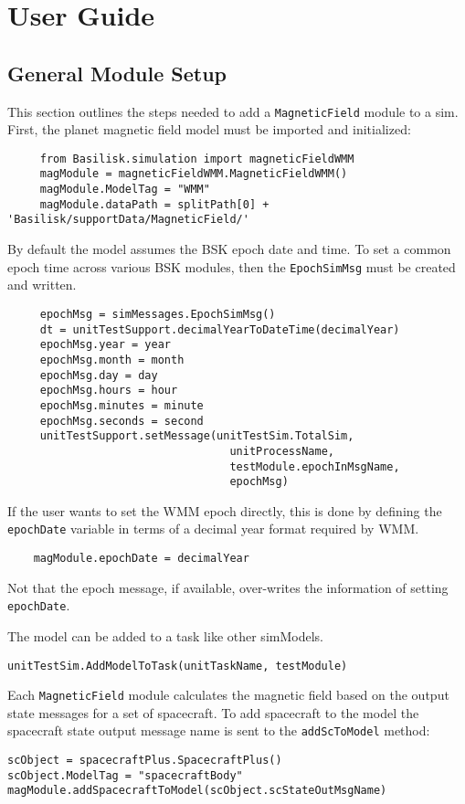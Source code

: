 
\section{User Guide}

\subsection{General Module Setup}
This section outlines the steps needed to add a {\tt MagneticField} module to a sim.
First, the planet magnetic field model must be imported and initialized:
\begin{verbatim}
     from Basilisk.simulation import magneticFieldWMM
     magModule = magneticFieldWMM.MagneticFieldWMM()
     magModule.ModelTag = "WMM"
     magModule.dataPath = splitPath[0] + 'Basilisk/supportData/MagneticField/'
\end{verbatim}
By default the model assumes the BSK epoch date and time.  To set a common epoch time across various BSK modules, then the {\tt EpochSimMsg} must be created and written.
\begin{verbatim}
     epochMsg = simMessages.EpochSimMsg()
     dt = unitTestSupport.decimalYearToDateTime(decimalYear)
     epochMsg.year = year
     epochMsg.month = month
     epochMsg.day = day
     epochMsg.hours = hour
     epochMsg.minutes = minute
     epochMsg.seconds = second
     unitTestSupport.setMessage(unitTestSim.TotalSim,
                                  unitProcessName,
                                  testModule.epochInMsgName,
                                  epochMsg)
\end{verbatim}
If the user wants to set the WMM epoch directly, this is done by defining the {\tt epochDate} variable in terms of a decimal year format required by WMM. 
\begin{verbatim}
	magModule.epochDate = decimalYear
\end{verbatim}
Not that the epoch message, if available, over-writes the information of setting {\tt epochDate}.  

The model can  be added to a task like other simModels. 
\begin{verbatim}
unitTestSim.AddModelToTask(unitTaskName, testModule)
\end{verbatim}

Each {\tt MagneticField} module calculates the magnetic field based on the output state messages for a set of spacecraft.
To add spacecraft to the model the spacecraft state output message name is sent to the \verb|addScToModel| method:
\begin{verbatim}
scObject = spacecraftPlus.SpacecraftPlus()
scObject.ModelTag = "spacecraftBody"
magModule.addSpacecraftToModel(scObject.scStateOutMsgName)
\end{verbatim}

